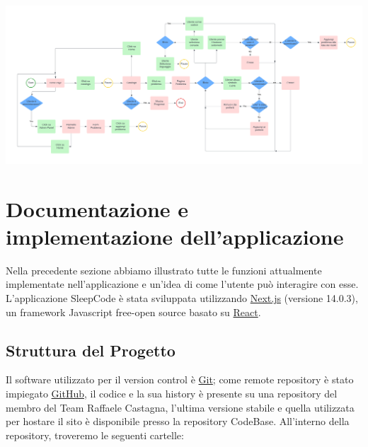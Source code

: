 \documentclass[11pt, a4paper]{article}
\theoremstyle{definition}
\begin{document}
  \includegraphics[width=\textwidth]{materiale/UserFlow Utilizzo.png}

\newpage
\section{Documentazione e implementazione dell'applicazione}
Nella precedente sezione abbiamo illustrato tutte le funzioni attualmente implementate nell'applicazione e un'idea di come l'utente può interagire con esse.
L'applicazione SleepCode è stata sviluppata utilizzando \href{https://nextjs.org/}{Next.js} (versione 14.0.3), un framework Javascript free-open source basato su \href{https://react.dev/}{React}.

\subsection{Struttura del Progetto}
Il software utilizzato per il version control è \href{https://git-scm.com/}{Git}; come remote repository è stato impiegato \href{www.github.com}{GitHub},
il codice e la sua history è presente su una repository del membro del Team Raffaele Castagna, l'ultima versione stabile e quella utilizzata per hostare il sito è disponibile presso la repository CodeBase. All'interno della repository,
troveremo le seguenti cartelle:
\end{document}
